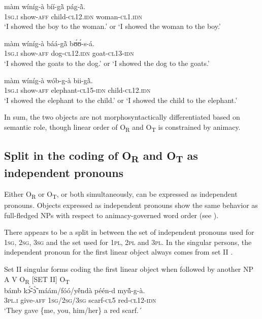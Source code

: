 \documentclass[output=paper]{langsci/langscibook}
\begin{document}
\ea
\label{ex:16.pacchiarotti}
\gll màm    wíníg-à    bíí-g\`{ã}      pág-\`{ã}. \\
\textsc{1sg.i}    show-\textsc{aff}    child-\textsc{cl12.idn}  woman-\textsc{cl1.idn}\\
\glt`I showed the boy to the woman.' or `I showed the woman to the boy.'
\z

\ea
\label{ex:17.pacchiarotti}
\gll màm    wíníg-à    báá-g\`{ã}    bʊ́ʊ́-s-á. \\
\textsc{1sg.i}    show-\textsc{aff}    dog-\textsc{cl12.idn}  goat-\textsc{cl13-idn}\\
\glt`I showed the goats to the dog.' or `I showed the dog to the goats.'  
\z

\ea
\label{ex:18.pacchiarotti}
\gll màm    wíníg-à    wób-g-à    bii-g\`{ã}. \\
\textsc{1sg.i}    show-\textsc{aff}    elephant-\textsc{cl15-idn}  child-\textsc{cl12.idn}\\
\glt `I showed the elephant to the child.' or `I showed the child to the elephant.'
\z

In sum, the two objects are not morphosyntactically differentiated based on semantic role, though linear order of O\textsubscript{R} and O\textsubscript{T} is constrained by animacy.

\subsection{Split in the coding of O\textsubscript{R} and O\textsubscript{T} as independent pronouns}\label{§4.3:split.pacchiarotti}

Either O\textsubscript{R} or O\textsubscript{T}, or both simultaneously, can be expressed as independent pronouns. Objects expressed as independent pronouns show the same behavior as full-fledged NPs with respect to animacy-governed word order (see ). 

There appears to be a split in  between the set of independent pronouns used for 1\textsc{sg}, 2\textsc{sg}, 3\textsc{sg} and the set used for 1\textsc{pl}, 2\textsc{pl} and 3\textsc{pl}. In the singular persons, the independent pronoun for the first linear object always comes from set II . 


\ea\label{ex:fig:1.pacchiarotti}
{  Set II singular forms coding the first linear object when followed by another NP} \\
\glll  
A  V  {O\textsubscript{R} [SET II]}  O\textsubscript{T} \\
		  bámb  k\'{\~ɔ}-\`{\~ɔ}    máám/fóó/{y\'{\~e}ndà}    péén-d  my\'{\~u}-g-à. \\
		  3\textsc{pl.i}   give-\textsc{aff}   1\textsc{sg}/2\textsc{sg}/3\textsc{sg}  scarf-\textsc{cl}5   red-\textsc{cl}12-\textsc{idn}\\
	\glt `They gave \{me, you, him\slash her\} a red scarf.´
\z    
\end{document}
